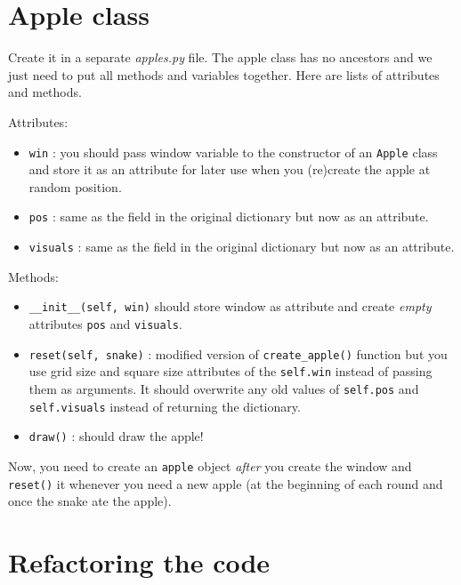 \documentclass[
]{book}
\providecommand{\tightlist}{%
  \setlength{\itemsep}{0pt}\setlength{\parskip}{0pt}}
\begin{document}
\hypertarget{apple-class}{%
\section{Apple class}\label{apple-class}}

Create it in a separate \emph{apples.py} file. The apple class has no ancestors and we just need to put all methods and variables together. Here are lists of attributes and methods.

Attributes:

\begin{itemize}
\tightlist
\item
  \texttt{win} : you should pass window variable to the constructor of an \texttt{Apple} class and store it as an attribute for later use when you (re)create the apple at random position.
\item
  \texttt{pos} : same as the field in the original dictionary but now as an attribute.
\item
  \texttt{visuals} : same as the field in the original dictionary but now as an attribute.
\end{itemize}

Methods:

\begin{itemize}
\tightlist
\item
  \texttt{\_\_init\_\_(self,\ win)} should store window as attribute and create \emph{empty} attributes \texttt{pos} and \texttt{visuals}.
\item
  \texttt{reset(self,\ snake)} : modified version of \texttt{create\_apple()} function but you use grid size and square size attributes of the \texttt{self.win} instead of passing them as arguments. It should overwrite any old values of \texttt{self.pos} and \texttt{self.visuals} instead of returning the dictionary.
\item
  \texttt{draw()} : should draw the apple!
\end{itemize}

Now, you need to create an \texttt{apple} object \emph{after} you create the window and \texttt{reset()} it whenever you need a new apple (at the beginning of each round and once the snake ate the apple).

\hypertarget{refactoring-the-code}{%
\section{Refactoring the code}\label{refactoring-the-code}}
\end{document}
